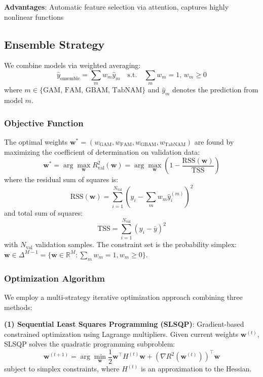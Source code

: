 \documentclass[twocolumn]{article}
\begin{document}
\textbf{Advantages}: Automatic feature selection via attention, captures highly nonlinear functions

\subsection{Ensemble Strategy}

We combine models via weighted averaging:
\begin{equation}
\hat{y}_{\text{ensemble}} = \sum_{m} w_m \hat{y}_m \quad \text{s.t.} \quad \sum_m w_m = 1, \, w_m \geq 0
\end{equation}
where $m \in \{\text{GAM, FAM, GBAM, TabNAM}\}$ and $\hat{y}_m$ denotes the prediction from model $m$.

\subsubsection{Objective Function}

The optimal weights $\mathbf{w}^* = (w_{\text{GAM}}, w_{\text{FAM}}, w_{\text{GBAM}}, w_{\text{TabNAM}})$ are found by maximizing the coefficient of determination on validation data:
\begin{equation}
\mathbf{w}^* = \arg\max_{\mathbf{w}} R^2_{\text{val}}(\mathbf{w}) = \arg\max_{\mathbf{w}} \left( 1 - \frac{\text{RSS}(\mathbf{w})}{\text{TSS}} \right)
\end{equation}
where the residual sum of squares is:
\begin{equation}
\text{RSS}(\mathbf{w}) = \sum_{i=1}^{N_{\text{val}}} \left( y_i - \sum_m w_m \hat{y}_i^{(m)} \right)^2
\end{equation}
and total sum of squares:
\begin{equation}
\text{TSS} = \sum_{i=1}^{N_{\text{val}}} (y_i - \bar{y})^2
\end{equation}
with $N_{\text{val}}$ validation samples. The constraint set is the probability simplex: $\mathbf{w} \in \Delta^{M-1} = \{\mathbf{w} \in \mathbb{R}^M : \sum_m w_m = 1, w_m \geq 0\}$.

\subsubsection{Optimization Algorithm}

We employ a multi-strategy iterative optimization approach combining three methods:

\textbf{(1) Sequential Least Squares Programming (SLSQP)}: Gradient-based constrained optimization using Lagrange multipliers. Given current weights $\mathbf{w}^{(t)}$, SLSQP solves the quadratic programming subproblem:
\begin{equation}
\mathbf{w}^{(t+1)} = \arg\min_{\mathbf{w}} \frac{1}{2}\mathbf{w}^\top H^{(t)} \mathbf{w} + (\nabla R^2(\mathbf{w}^{(t)}))^\top \mathbf{w}
\end{equation}
subject to simplex constraints, where $H^{(t)}$ is an approximation to the Hessian.
\end{document}
